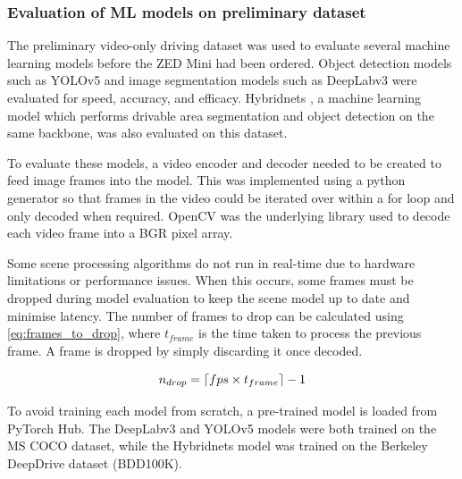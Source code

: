 \subsubsection{Evaluation of ML models on preliminary dataset}
The preliminary video-only driving dataset was used to evaluate
several machine learning models before the ZED Mini had been ordered.
Object detection models such as YOLOv5 \cite{ultralyticsYOLOv5} and image segmentation models such as
DeepLabv3 \cite{chenRethinkingAtrousConvolution2017} were evaluated for speed, accuracy, and efficacy.
Hybridnets \cite{vuHybridNetsEndtoEndPerception2022}, a machine learning model which
performs drivable area segmentation and object detection on the same backbone, was also evaluated on
this dataset.

To evaluate these models, a video encoder and decoder needed to be created
to feed image frames into the model. This was implemented using a python generator
so that frames in the video could be iterated over within a for loop and only decoded
when required. OpenCV \cite{bradskiOpenCVLibrary2000} was the underlying library used
to decode each video frame into a BGR pixel array.

Some scene processing algorithms do not run in real-time due to hardware limitations or performance issues.
When this occurs, some frames must be dropped during model evaluation to keep the scene model up to date and minimise latency.
The number of frames to drop can be calculated using \cref{eq:frames_to_drop},
where $t_{frame}$ is the time taken to process the previous frame.
A frame is dropped by simply discarding it once decoded.

\begin{equation}
n_{drop} = \lceil fps\times t_{frame}\rceil - 1
\label{eq:frames_to_drop}
\end{equation}

To avoid training each model from scratch, a pre-trained model is loaded from PyTorch Hub.
The DeepLabv3 and YOLOv5 models were both trained on the MS COCO \cite{linMicrosoftCOCOCommon2014} dataset,
while the Hybridnets model was trained on the Berkeley DeepDrive dataset \cite{yuBDD100KDiverseDriving2018} (BDD100K).


